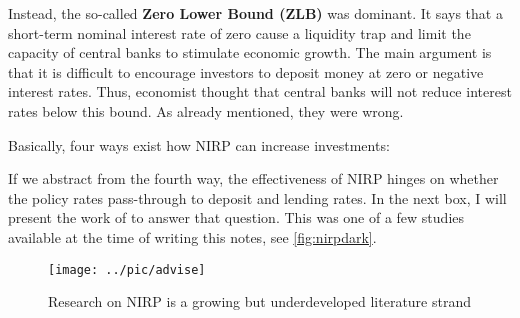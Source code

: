 Instead, the so-called \textbf{Zero Lower Bound (ZLB)} was dominant. It says that a short-term nominal interest rate of zero cause a liquidity trap and limit the capacity of central banks to stimulate economic growth. The main argument is that it is difficult to encourage investors to deposit money at zero or negative interest rates. Thus, economist thought that central banks will not reduce interest rates below this bound. As already mentioned, they were wrong. 



Basically, four ways exist how NIRP can increase investments:
\smallskip

If we abstract from the fourth way, the effectiveness of NIRP hinges on whether the policy rates pass-through to deposit and lending rates. 
In the next box, I will present the work of \cite{Eggertsson2017Are} to answer that question. This was one of a few studies available at the time of writing this notes, see \autoref{fig:nirpdark}.

\begin{figure}
	\begin{center}
		\texttt{[image: ../pic/advise]}
		\label{fig:advise}
	\end{center}
	\caption{Research on NIRP is a growing but underdeveloped literature strand}\label{fig:nirpdark}
\end{figure}


